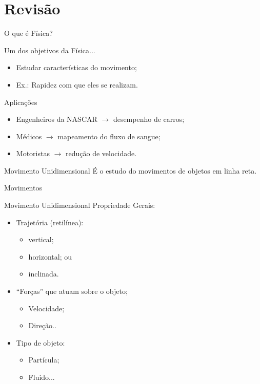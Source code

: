 \documentclass[xcolor=dvipsnames,table]{beamer}
\begin{document}
	\section{Revisão}
	\begin{frame}{O que é Física?}
		\begin{block}{Um dos objetivos da Física...}
			\begin{itemize}
				\item Estudar características do movimento; 
				\item Ex.: Rapidez com que eles se realizam.
			\end{itemize}
		\end{block} 
		\begin{block}{Aplicações}
			\begin{itemize}
				\item Engenheiros da NASCAR $\rightarrow$ desempenho de carros;
				\item Médicos $\rightarrow$ mapeamento do fluxo de sangue;
				\item Motoristas $\rightarrow$ redução de velocidade.
			\end{itemize}
		\end{block}
		\begin{block}{Movimento Unidimensional}
			É o estudo do movimentos de objetos em linha reta.
		\end{block}
	\end{frame}

	\begin{frame}{Movimentos}
		\begin{block}{Movimento Unidimensional}
			Propriedade Gerais:
			\begin{itemize}
				\item Trajetória (retilínea):
					\begin{itemize}
						\item vertical;
						\item horizontal; ou 
						\item inclinada.
					\end{itemize}
				\item ``Forças'' que atuam sobre o objeto;
					\begin{itemize}
						\item Velocidade;
						\item Direção..
					\end{itemize}
				\item Tipo de objeto:
					\begin{itemize}
						\item Partícula;
						\item Fluido...
					\end{itemize}
			\end{itemize}
		\end{block}
	\end{frame}
\end{document}
